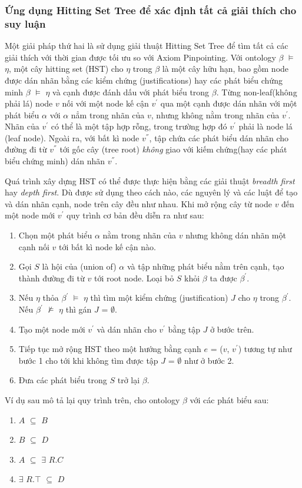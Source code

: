 \subsubsection{Ứng dụng Hitting Set Tree để xác định tất cả giải thích cho suy luận\cite{matt_horridge}}
Một giải pháp thứ hai là sử dụng giải thuật Hitting Set Tree \cite{hst} để tìm tất cả các giải thích với thời gian được tối ưu so với Axiom Pinpointing.	\hspace*{.05\textwidth} Với ontology $\beta$ $\models$ $\eta$, một cây hitting set (HST) cho $\eta$ trong $\beta$ là một cây hữu hạn, bao gồm node được dán nhãn bằng các kiểm chứng (justifications) hay các phát biểu chứng minh $\beta$ $\models$ $\eta$ và cạnh được đánh dấu với phát biểu trong $\beta$. Từng non-leaf(không phải lá) node $v$ nối với một node kế cận $v^{'}$ qua một cạnh được dán nhãn với một phát biểu $\alpha$ với $\alpha$ nẳm trong nhãn của $v$, nhưng không nằm trong nhãn của $v^{'}$. Nhãn của $v^{'}$ có thể là một tập hợp rỗng, trong trường hợp đó $v^{'}$ phải là node lá (leaf node). Ngoài ra, với bất kì node $v^{''}$, tập chứa các phát biểu dán nhãn cho đường đi từ $v^{''}$ tới gốc cây (tree root) \textit{không} giao với kiếm chứng(hay các phát biểu chứng minh) dán nhãn $v^{''}$.
		
\hspace*{.05\textwidth} Quá trình xây dựng HST có thể được thực hiện bằng các giải thuật \textit{breadth first} hay \textit{depth first}. Dù được sử dụng theo cách nào, các nguyên lý và các luật để tạo và dán nhãn cạnh, node trên cây đều như nhau. Khi mở rộng cây từ node $v$ đến một node mới $v^{'}$ quy trình cơ bản đều diễn ra như sau:
\begin{enumerate}
\item Chọn một phát biểu $\alpha$ nằm trong nhãn của $v$ nhưng không dán nhãn một cạnh nối $v$ tới bất kì node kế cận nào.
\item Gọi $S$ là hội của (union of) {$\alpha$} và tập những phát biểu nằm trên cạnh, tạo thành đường đi từ $v$ tới root node. Loại bỏ $S$ khỏi $\beta$ ta được $\beta^{'}$.
\item Nếu $\eta$ thỏa $\beta^{'}$ $\models$ $\eta$ thì tìm một kiểm chứng (justification) $J$ cho $\eta$ trong $\beta^{'}$. Nếu $\beta^{'}$ $\not\models$ $\eta$ thì gán $J$ = $\emptyset$.
\item Tạo một node mới $v^{'}$ và dán nhãn cho $v^{'}$ bằng tập $J$ ở bước trên.
\item Tiếp tục mở rộng HST theo một hướng bằng cạnh $e$ = ($v$, $v^{'}$) tương tự như bước 1 cho tới khi không tìm được tập $J$ = $\emptyset$ như ở bước 2.
\item Đưa các phát biểu trong $S$ trở lại $\beta$.
\end{enumerate}
Ví dụ sau mô tả lại quy trình trên, cho ontology $\beta$  với các phát biểu sau:
\begin{enumerate}
\item $A$ $\subseteq$ $B$
\item $B$ $\subseteq$ $D$ 
\item $A$ $\subseteq$ $\exists$ $R.C$ 
\item $\exists$ $R.\top$ $\subseteq$ $D$
\end{enumerate} 
		
